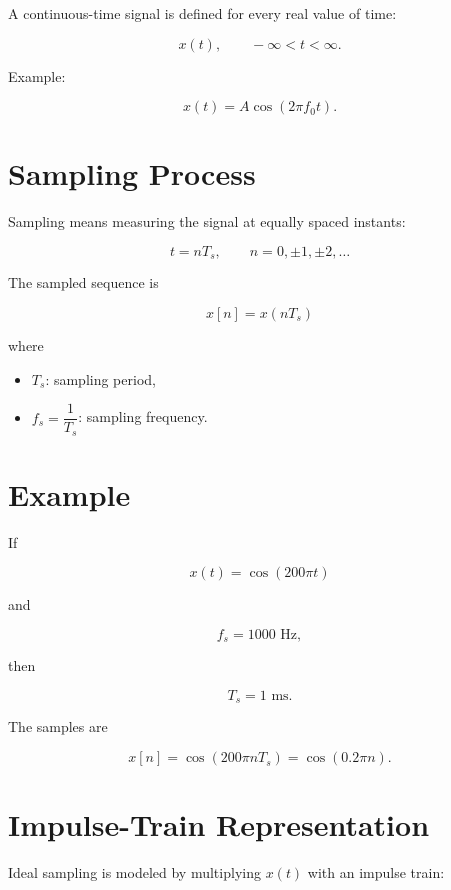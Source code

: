 A continuous-time signal is defined for every real value of time:

\[
x(t),\qquad -\infty<t<\infty.
\]

Example:

\[
x(t)=A\cos(2\pi f_0 t).
\]


\section{Sampling Process}

Sampling means measuring the signal at equally spaced instants:

\[
t=nT_s,
\qquad n=0,\pm1,\pm2,\ldots
\]

The sampled sequence is

\[
\boxed{
x[n]=x(nT_s)
}
\]

where

\begin{itemize}
\item \(T_s\): sampling period,
\item \(f_s=\dfrac{1}{T_s}\): sampling frequency.
\end{itemize}


\section{Example}

If

\[
x(t)=\cos(200\pi t)
\]

and

\[
f_s=1000\text{ Hz},
\]

then

\[
T_s=1\text{ ms}.
\]

The samples are

\[
x[n]=\cos(200\pi nT_s)
=\cos(0.2\pi n).
\]


\section{Impulse-Train Representation}

Ideal sampling is modeled by multiplying \(x(t)\) with an impulse train:

